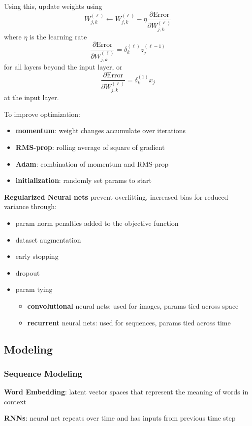 \documentclass[11pt]{article}
\begin{document}
Using this, update weights using
$$ W_{j, k}^{(\ell)} \gets W_{j, k}^{(\ell)} - \eta \frac{\partial \text{Error}}{\partial W_{j, k}^{(\ell)}} $$
where \(\eta\) is the learning rate
$$ \frac{\partial \text{Error}}{\partial W_{j, k}^{(\ell)}} = \delta_{k}^{(\ell)} z_{j}^{(\ell - 1)} $$
for all layers beyond the input layer, or
$$ \frac{\partial \text{Error}}{\partial W_{j, k}^{(\ell)}} = \delta_{k}^{(1)} x_{j} $$
at the input layer.

To improve optimization:
\begin{itemize}
\item \textbf{momentum}: weight changes accumulate over iterations
\item \textbf{RMS-prop}: rolling average of square of gradient
\item \textbf{Adam}: combination of momentum and RMS-prop
\item \textbf{initialization}: randomly set params to start
\end{itemize}

\textbf{Regularized Neural nets} prevent overfitting, increased bias for reduced variance through:
\begin{itemize}
\item param norm penalties added to the objective function
\item dataset augmentation
\item early stopping
\item dropout
\item param tying
\begin{itemize}
\item \textbf{convolutional} neural nets: used for images, params tied across space
\item \textbf{recurrent} neural nets: used for sequences, params tied across time
\end{itemize}
\end{itemize}
\subsection{Modeling}
\label{sec:orgc2cb67c}
\subsubsection{Sequence Modeling}
\label{sec:org0bc7c54}
\textbf{Word Embedding}: latent vector spaces that represent the meaning of words in context

\textbf{RNNs}: neural net repeats over time and has inputs from previous time step
\end{document}
